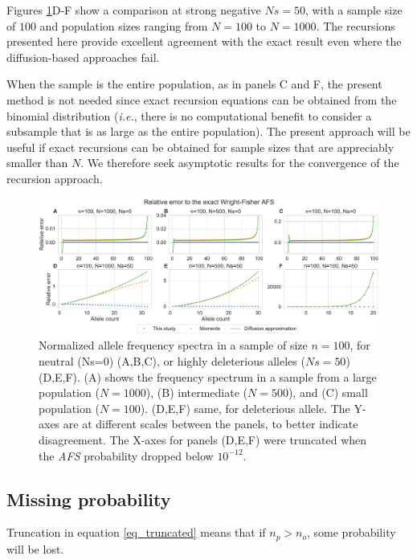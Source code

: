 \documentclass[review]{elsarticle}
\newcommand{\sgcomment}[1]{{\color{red}{SG: #1}}}
\newcommand{\ikcomment}[1]{{\color{blue}{IK: #1}}}
\begin{document}
Figures \ref{fig_strong-selection}D-F show a comparison at strong negative $Ns=50$, with a
sample size of $100$ and population sizes ranging from $N=100$ to  $N=1000.$  
The recursions presented here provide excellent agreement with the exact result even 
where the diffusion-based approaches fail. 

When the sample is the entire population, as in panels C and F, the present method is not needed since
exact recursion equations can be obtained from the binomial distribution 
(\textit{i.e.}, there is no computational benefit to consider a subsample that is as large as the entire population). 
The present approach will be useful if exact recursions can be obtained for sample sizes that are appreciably smaller
than $N$. We therefore seek asymptotic results for the convergence of the recursion approach.

\begin{figure}
  \centering
  \includegraphics[width=0.7\textheight]{fig/strong_selection_six_panel.pdf}
  \caption{Normalized allele frequency spectra in a sample of size $n=100$, for neutral (Ns=0)
    (A,B,C), or highly deleterious alleles ($Ns=50$) (D,E,F). (A) shows the frequency spectrum in a
    sample from a large population ($N=1000$), (B) intermediate ($N=500$), and (C) small population
    ($N=100$). (D,E,F) same, for deleterious allele. The Y-axes are at different scales between the
    panels, to better indicate disagreement. The X-axes for panels (D,E,F) were truncated
    when the \textit{AFS} probability dropped below $10^{-12}$. }
  \label{fig_strong-selection}
\end{figure}

\subsection{Missing probability}
\label{subsec_missing}

Truncation in equation \ref{eq_truncated} means that if $n_p > n_o$, some probability will be lost. 
 \sgcomment{Did you do re-normalization of the truncated matrix?} \ikcomment{I did for figure 3, yes}
\end{document}

